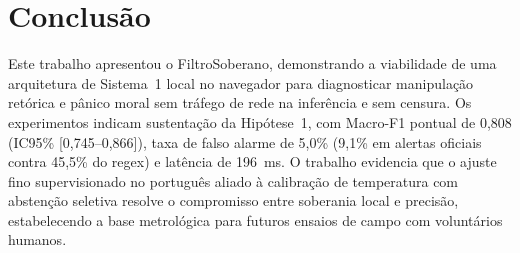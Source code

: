 \documentclass[runningheads]{llncs}
\begin{document}
\section{Conclusão}

Este trabalho apresentou o FiltroSoberano, demonstrando a viabilidade de uma arquitetura de Sistema~1 local no navegador para diagnosticar manipulação retórica e pânico moral sem tráfego de rede na inferência e sem censura. Os experimentos indicam sustentação da Hipótese~1, com Macro-F1 pontual de 0,808 (IC95\% [0,745--0,866]), taxa de falso alarme de 5,0\% (9,1\% em alertas oficiais contra 45,5\% do regex) e latência de 196~ms. O trabalho evidencia que o ajuste fino supervisionado no português aliado à calibração de temperatura com abstenção seletiva resolve o compromisso entre soberania local e precisão, estabelecendo a base metrológica para futuros ensaios de campo com voluntários humanos.



\end{document}
